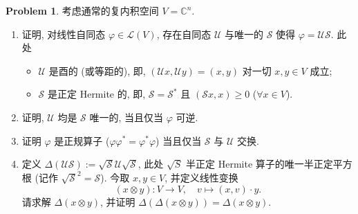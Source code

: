 \documentclass{MainStyle}
\theoremstyle{definition}
\newtheorem{problem}{Problem}
\begin{document}
\begin{problem}
考虑通常的复内积空间 $V=\mathbb C^n$.
\begin{enumerate}
    \item 证明, 对线性自同态 $\varphi\in\mathcal L(V)$, 存在自同态 $\mathcal U$ 与唯一的 $\mathcal S$ 使得 $\varphi=\mathcal U\mathcal S$. 此处
          \begin{itemize}
              \item $\mathcal U$ 是酉的 (或等距的), 即, $(\mathcal U x,\mathcal Uy)=(x,y)$ 对一切 $x,y\in V$ 成立;
              \item $\mathcal S$ 是正定 Hermite 的, 即, $\mathcal S=\mathcal S^\ast$ 且 $(\mathcal Sx,x)\geq 0$ ($\forall x\in V$).
          \end{itemize}
    \item 证明, $\mathcal U$ 均是 $\mathcal S$ 唯一的, 当且仅当 $\varphi$ 可逆.
    \item 证明 $\varphi$ 是正规算子 ($\varphi\varphi ^\ast =\varphi^\ast\varphi$) 当且仅当 $\mathcal S$ 与 $\mathcal U$ 交换.
    \item 定义 $\Delta (\mathcal U\mathcal S):=\sqrt{\mathcal S}\mathcal U\sqrt{\mathcal S}$, 此处 $\sqrt{S}$ 半正定 Hermite 算子的唯一半正定平方根 (记作 $\sqrt{\mathcal S}^2=\mathcal S$). 今取 $x,y\in V$, 并定义线性变换
          \begin{equation}
              (x\otimes y):V\to V,\quad v\mapsto (x,v)\cdot y.
          \end{equation}
          请求解 $\Delta (x\otimes y)$, 并证明 $\Delta (\Delta (x\otimes y))=\Delta (x\otimes y)$.
\end{enumerate}
\end{problem}
\end{document}
